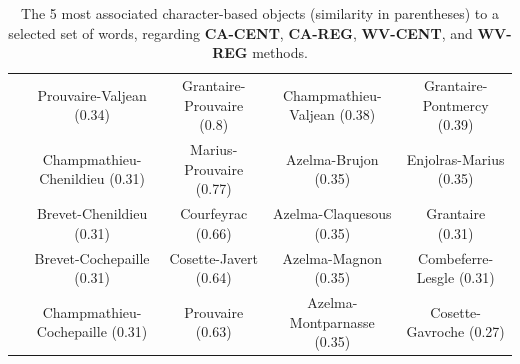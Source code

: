 \documentclass[
twocolumn,
]{ceurart}
\begin{document}
\begin{table}[!bh]
{\begin{tabular}{|c|c|c|c|c|}
		\hline
		\hline
		\parbox[t]{2mm}{} & Prouvaire-Valjean (0.34) & Grantaire-Prouvaire (0.8) & Champmathieu-Valjean (0.38) & Grantaire-Pontmercy (0.39) \\
		& Champmathieu-Chenildieu (0.31) & Marius-Prouvaire (0.77) & Azelma-Brujon (0.35) & Enjolras-Marius (0.35) \\
		& Brevet-Chenildieu (0.31) & Courfeyrac (0.66) & Azelma-Claquesous (0.35) & Grantaire (0.31) \\
		& Brevet-Cochepaille (0.31) & Cosette-Javert (0.64) & Azelma-Magnon (0.35) & Combeferre-Lesgle (0.31) \\
		& Champmathieu-Cochepaille (0.31) & Prouvaire (0.63) & Azelma-Montparnasse (0.35) & Cosette-Gavroche (0.27) \\ \hline
	\end{tabular}
	}
	\label{CA_CENT_obj_words}
	\caption{The 5 most associated character-based objects (similarity in parentheses) to a selected set of words, regarding \textbf{CA-CENT}, \textbf{CA-REG}, \textbf{WV-CENT}, and \textbf{WV-REG} methods.}
\end{table}


\end{document}
